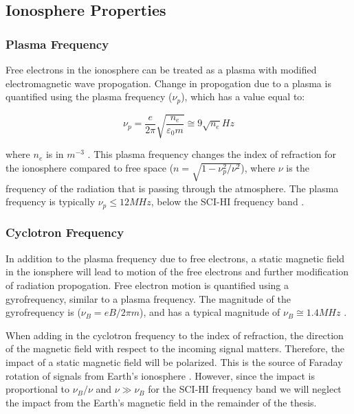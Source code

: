 \subsection{Ionosphere Properties}

\subsubsection{Plasma Frequency}

Free electrons in the ionosphere can be treated as a plasma with modified electromagnetic wave propogation. Change in propogation due to a plasma is quantified using the plasma frequency ($\nu_p$), which has a value equal to:

\begin{equation}
\nu_p = \frac{e}{2 \pi} \sqrt{\frac{n_e}{\varepsilon_0 m}} \cong 9 \sqrt{n_e} Hz
\end{equation}

where $n_e$ is in $m^{-3}$ \cite{thompson_2001}. This plasma frequency changes the index of refraction for the ionosphere compared to free space ($n = \sqrt{1-\nu_p^2/\nu^2}$), where $\nu$ is the frequency of the radiation that is passing through the atmosphere. The plasma frequency is typically $\nu_p \leq 12 MHz$, below the SCI-HI frequency band \cite{thompson_2001}. 

\subsubsection{Cyclotron Frequency}

In addition to the plasma frequency due to free electrons, a static magnetic field in the ionsphere will lead to motion of the free electrons and further modification of radiation propogation. Free electron motion is quantified using a gyrofrequency, similar to a plasma frequency. The magnitude of the gyrofrequency is ($\nu_B = eB/2 \pi m$), and has a typical magnitude of $\nu_B \cong 1.4 MHz$ \cite{thompson_2001}. 

When adding in the cyclotron frequency to the index of refraction, the direction of the magnetic field with respect to the incoming signal matters. Therefore, the impact of a static magnetic field will be polarized. This is the source of Faraday rotation of signals from Earth's ionosphere \cite{thompson_2001}. However, since the impact is proportional to $\nu_B/\nu$ and $\nu \gg \nu_B$ for the SCI-HI frequency band we will neglect the impact from the Earth's magnetic field in the remainder of the thesis. 


